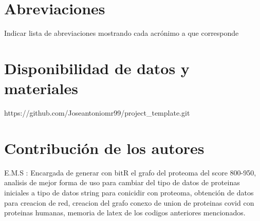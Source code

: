 \documentclass{bmcart}
\begin{document}
	\begin{backmatter}
	
		\section*{Abreviaciones}%
			Indicar lista de abreviaciones mostrando cada acrónimo a que corresponde
		
		\section*{Disponibilidad de datos y materiales}%
			https://github.com/Joseantoniomr99/project_template.git
		
		\section*{Contribución de los autores}
			E.M.S : Encargada de generar con bitR el grafo del proteoma del score 800-950, analisis de mejor forma de uso para cambiar del tipo de 
			datos de proteinas iniciales a tipo de datos string para conicidir con proteoma, obtención de datos para creacion de red,
			creacion del grafo conexo de union de proteinas covid con proteinas humanas, memoria de latex de los codigos anteriores mencionados.
		
		
		
	
	\end{backmatter}
\end{document}
